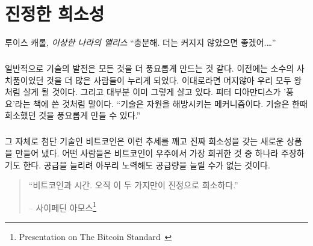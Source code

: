 
\chapter{진정한 희소성}
\label{les:2}

\begin{chapquote}{루이스 캐롤, \textit{이상한 나라의 앨리스}}
	\enquote{충분해. 더는 커지지 않았으면 좋겠어.\ldots}
\end{chapquote}


\paragraph{}
일반적으로 기술의 발전은 모든 것을 더 풍요롭게 만드는 것 같다. 이전에는 소수의 사치품이었던 것을 더 많은 사람들이 누리게 되었다. 
이대로라면 머지않아 우리 모두 왕처럼 살게 될 것이다. 그리고 대부분 이미 그렇게 살고 있다.
피터 디아만디스가 '풍요'라는 책에 쓴 것처럼 말이다.\cite{abundance} \enquote{기술은 자원을 해방시키는 메커니즘이다. 기술은 한때 희소했던 것을 풍요롭게 만들 수 있다.}

\paragraph{}
그 자체로 첨단 기술인 비트코인은 이런 추세를 깨고 진짜 희소성을 갖는 새로운 상품을 만들어 냈다. 
어떤 사람들은 비트코인이 우주에서 가장 희귀한 것 중 하나라 주장하기도 한다.
공급을 늘리려 아무리 노력해도 공급량을 늘릴 수가 없는 것이다. 

\begin{quotation}
	\begin{samepage} \enquote{비트코인과 시간. 오직 이 두 가지만이 진정으로 희소하다.}
		\begin{flushright} -- 사이페딘 아모스\footnote{Presentation on The Bitcoin Standard~\cite{bitcoinstandard-pres}}
		\end{flushright}
	\end{samepage}
\end{quotation}

